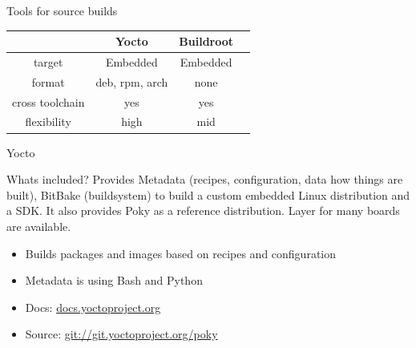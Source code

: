 \documentclass{beamer}
\begin{document}
\begin{frame}{Tools for source builds}
	\begin{tabular}{c|ccc}
		& \textbf{Yocto} & \textbf{Buildroot}  \\
		\hline
		target & Embedded  & Embedded \\ 
		format & deb, rpm, arch & none \\
		cross toolchain & yes & yes \\
		flexibility & high & mid \\
	\end{tabular}
\end{frame}



\begin{frame}{Yocto}
	\begin{block}{Whats included?}
		Provides Metadata (recipes, configuration, data how things are built), BitBake (buildsystem) to build a custom embedded Linux distribution and a SDK. It also provides Poky as a reference distribution. Layer for many boards are available.
	\end{block}

	\begin{itemize}
		\item Builds packages and images based on recipes and configuration
		\item Metadata is using Bash and Python
		\item Docs: \href{https://docs.yoctoproject.org/}{docs.yoctoproject.org}
		\item Source: \url{git://git.yoctoproject.org/poky}
	\end{itemize}
\end{frame}
\end{document}
